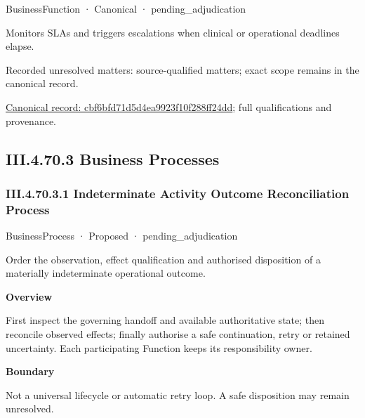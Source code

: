 \label{element:cbf6bfd71d5d4ea9923f10f288ff24dd}
{\small BusinessFunction · Canonical · pending\_adjudication}\par

Monitors SLAs and triggers escalations when clinical or operational deadlines elapse.


{\small Recorded unresolved matters: source-qualified matters; exact scope remains in the canonical record.}\par
{\footnotesize \href{../../../../continuum/business/business-function/cbf6bfd71d5d4ea9923f10f288ff24dd.md}{Canonical record: cbf6bfd71d5d4ea9923f10f288ff24dd}; full qualifications and provenance.}\par
\subsection*{III.4.70.3 Business Processes}
\label{navigation:III.4.70.3}

\subsubsection*{III.4.70.3.1 Indeterminate Activity Outcome Reconciliation Process}
\label{navigation:III.4.70.3.1}

\label{element:96baf3721ce94397a11486184d3df7cf}
{\small BusinessProcess · Proposed · pending\_adjudication}\par

Order the observation, effect qualification and authorised disposition of a materially indeterminate operational outcome.



\textbf{Overview}



First inspect the governing handoff and available authoritative state; then reconcile observed effects; finally authorise a safe continuation, retry or retained uncertainty. Each participating Function keeps its responsibility owner.



\textbf{Boundary}



Not a universal lifecycle or automatic retry loop. A safe disposition may remain unresolved.


